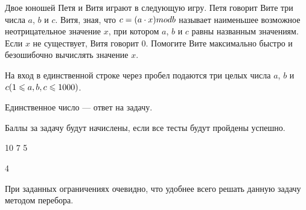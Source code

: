 
Двое юношей Петя и Витя играют в следующую игру. Петя говорит Вите три числа $a$, $b$ и $c$. Витя, зная, что $c = (a \cdot x)\space mod\space b$  
называет наименьшее возможное неотрицательное значение $x$, при котором $a$, $b$ и $c$ равны названным значениям. 
Если $x$ не существует, Витя говорит $0$. Помогите Вите максимально быстро и безошибочно вычислять значение $x$.


На вход в единственной строке через пробел подаются три целых числа $a$, $b$ и $c\space (1 \leq a, b, c \leq 1000)$.

\outputfmtSection

Единственное число — ответ на задачу.

\markSection

Баллы за задачу будут начислены, если все тесты будут пройдены успешно.


\begin{myverbbox}[\small]{\vinput}
    10 7 5
\end{myverbbox}
\begin{myverbbox}[\small]{\voutput}
    4
\end{myverbbox}

\solutionSection

При заданных ограничениях очевидно, что удобнее всего решать данную задачу методом перебора.

